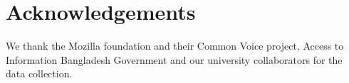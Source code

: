 \chapter{Acknowledgements}
We thank the Mozilla foundation and their Common Voice project, Access to Information Bangladesh Government and our university collaborators for the data collection.